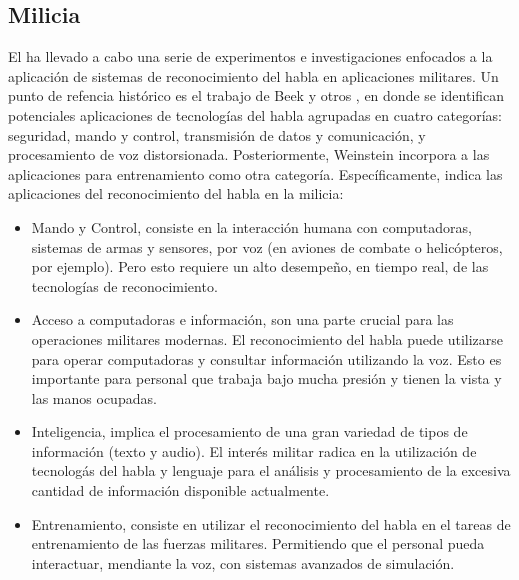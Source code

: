 \subsection{Milicia}
\label{sec:milicia}

El  ha llevado a cabo una serie de experimentos e investigaciones
enfocados a la aplicaci\'on de sistemas de reconocimiento del habla en aplicaciones militares.
Un punto de refencia hist\'orico  es el
trabajo de Beek y otros \cite{BeekAn1977}, en donde se identifican potenciales aplicaciones
de tecnolog\'ias del habla agrupadas en cuatro categor\'ias: seguridad, mando y control, transmisi\'on de datos y comunicaci\'on, y
procesamiento de voz distorsionada. Posteriormente, Weinstein \cite{WeinsteinOpportunities1991} incorpora
a las aplicaciones para entrenamiento como otra categor\'ia. Espec\'ificamente, \cite{PigeonUse2006} indica
las aplicaciones del reconocimiento del habla en la milicia:

\begin{itemize}
    \item Mando y Control, consiste en la interacci\'on humana con computadoras, sistemas
	de armas y sensores, por voz (en aviones de combate o helic\'opteros, por ejemplo). Pero esto
	requiere un alto desempe\~no, en tiempo real, de las tecnolog\'ias de reconocimiento.
    \item Acceso a computadoras e informaci\'on, son una parte crucial para las operaciones militares modernas. El
	reconocimiento del habla puede utilizarse para operar computadoras y consultar informaci\'on utilizando la voz. Esto
	es importante para personal que trabaja bajo mucha presi\'on y tienen la vista y las manos ocupadas.
    \item Inteligencia, implica el procesamiento de una gran variedad de tipos de informaci\'on (texto y audio). El inter\'es militar
	radica en la utilizaci\'on de tecnolog\'as del habla y lenguaje para el an\'alisis y procesamiento
	de la excesiva cantidad de informaci\'on disponible actualmente.
    \item Entrenamiento, consiste en utilizar el reconocimiento del habla en el tareas de entrenamiento de las fuerzas
	militares. Permitiendo que el personal pueda interactuar, mendiante la voz, con sistemas avanzados de simulaci\'on.
\end{itemize}
